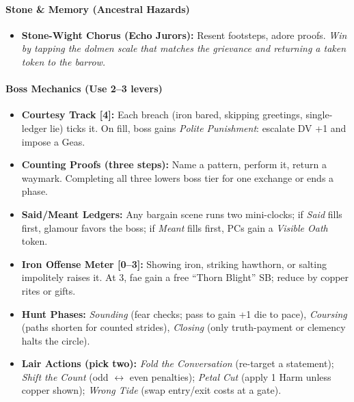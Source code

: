 \paragraph{Stone \& Memory (Ancestral Hazards)}
\begin{itemize}
  \item \textbf{Stone-Wight Chorus (Echo Jurors):} Resent footsteps, adore proofs. \emph{Win by tapping the dolmen scale that matches the grievance and returning a taken token to the barrow.}
\end{itemize}

\paragraph{Boss Mechanics (Use 2--3 levers)}
\begin{itemize}
  \item \textbf{Courtesy Track [4]:} Each breach (iron bared, skipping greetings, single-ledger lie) ticks it. On fill, boss gains \emph{Polite Punishment}: escalate DV +1 and impose a Geas.
  \item \textbf{Counting Proofs (three steps):} Name a pattern, perform it, return a waymark. Completing all three lowers boss tier for one exchange or ends a phase.
  \item \textbf{Said/Meant Ledgers:} Any bargain scene runs two mini-clocks; if \emph{Said} fills first, glamour favors the boss; if \emph{Meant} fills first, PCs gain a \emph{Visible Oath} token.
  \item \textbf{Iron Offense Meter [0–3]:} Showing iron, striking hawthorn, or salting impolitely raises it. At 3, fae gain a free ``Thorn Blight'' SB; reduce by copper rites or gifts.
  \item \textbf{Hunt Phases:} \emph{Sounding} (fear checks; pass to gain +1 die to pace), \emph{Coursing} (paths shorten for counted strides), \emph{Closing} (only truth-payment or clemency halts the circle).
  \item \textbf{Lair Actions (pick two):} \emph{Fold the Conversation} (re-target a statement); \emph{Shift the Count} (odd $\leftrightarrow$ even penalties); \emph{Petal Cut} (apply 1 Harm unless copper shown); \emph{Wrong Tide} (swap entry/exit costs at a gate).
\end{itemize}